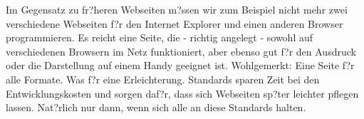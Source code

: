 Im Gegensatz zu fr?heren Webseiten m?ssen wir zum Beispiel nicht mehr zwei verschiedene Webseiten f?r den Internet Explorer und einen anderen Browser programmieren. Es reicht eine Seite, die - richtig angelegt - sowohl auf verschiedenen Browsern im Netz funktioniert, aber ebenso gut f?r den Ausdruck oder die Darstellung auf einem Handy geeignet ist. Wohlgemerkt: Eine Seite f?r alle Formate. Was f?r eine Erleichterung. Standards sparen Zeit bei den Entwicklungskosten und sorgen daf?r, dass sich Webseiten sp?ter leichter pflegen lassen. Nat?rlich nur dann, wenn sich alle an diese Standards halten.